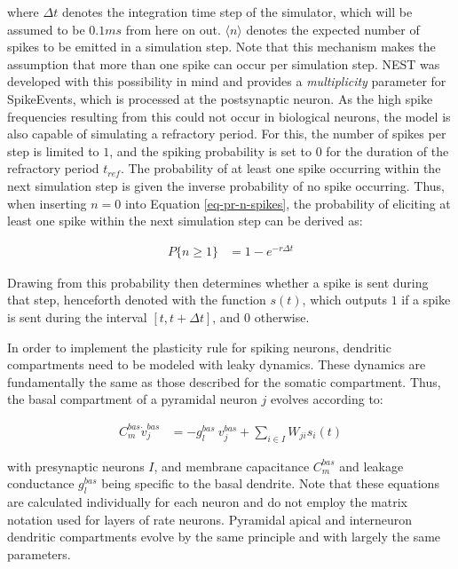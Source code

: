 where $\Delta t$ denotes the integration time step of the simulator, which will be assumed to be $0.1 ms$ from here on
out.  $\langle \textit{n} \rangle$ denotes the expected number of spikes to be emitted in a simulation step. Note that
this mechanism makes the assumption that more than one spike can occur per simulation step. NEST was developed with this
possibility in mind and provides a \textit{multiplicity} parameter for SpikeEvents, which is processed at the
postsynaptic neuron. As the high spike frequencies resulting from this could not occur in biological neurons, the model
is also capable of simulating a refractory period. For this, the number of spikes per step is limited to $1$, and the
spiking probability is set to 0 for the duration of the refractory period $t_{ref}$. The probability of at least one
spike occurring within the next simulation step is given the inverse probability of no spike occurring. Thus, when
inserting $n=0$ into Equation \ref{eq-pr-n-spikes}, the probability of eliciting at least one spike within the next
simulation step can be derived as:

\begin{align}
  P\{ \textit{n} \geq 1\} & = 1 - e^{-r \Delta t}
\end{align}


Drawing from this probability then determines whether a spike is sent during that step, henceforth denoted with the
function $s(t)$, which outputs $1$ if a spike is sent during the interval $[t, t+\Delta t]$, and $0$ otherwise.
\newline

In order to implement the plasticity rule for spiking neurons, dendritic compartments need to be modeled with leaky
dynamics. These dynamics are fundamentally the same as those described for the somatic compartment. Thus, the basal
compartment of a pyramidal neuron $j$ evolves according to:

\begin{align}
  C_m^{bas} \dot{v}_j^{bas} & = -g_l^{bas} \  v_j^{bas} + \sum_{i \in I} W_{ji} s_i(t)     \label{eq-spiking-basal-compartment}
\end{align}

with presynaptic neurons $I$, and membrane capacitance $C_m^{bas}$ and leakage conductance $g_l^{bas}$ being specific to
the basal dendrite. Note that these equations are calculated individually for each neuron and do not employ the matrix
notation used for layers of rate neurons. Pyramidal apical and interneuron dendritic compartments evolve by the same
principle and with largely the same parameters.


